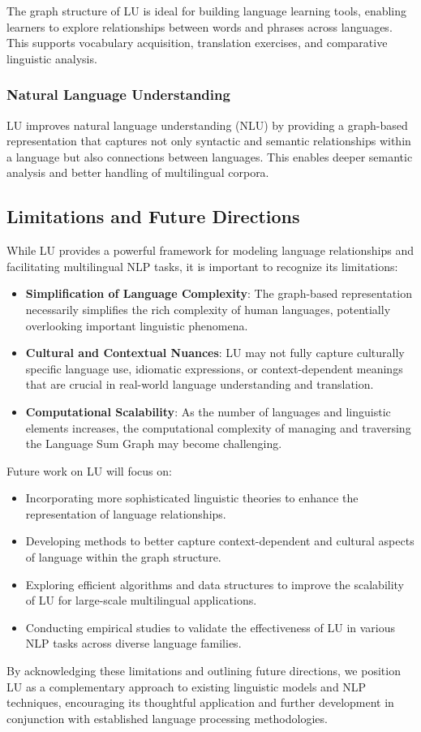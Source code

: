 The graph structure of LU is ideal for building language learning tools, enabling learners to explore relationships between words and phrases across languages. This supports vocabulary acquisition, translation exercises, and comparative linguistic analysis.

\subsubsection{Natural Language Understanding}

LU improves natural language understanding (NLU) by providing a graph-based representation that captures not only syntactic and semantic relationships within a language but also connections between languages. This enables deeper semantic analysis and better handling of multilingual corpora.

\subsection{Limitations and Future Directions}

While LU provides a powerful framework for modeling language relationships and facilitating multilingual NLP tasks, it is important to recognize its limitations:

\begin{itemize}
    \item \textbf{Simplification of Language Complexity}: The graph-based representation necessarily simplifies the rich complexity of human languages, potentially overlooking important linguistic phenomena.
    \item \textbf{Cultural and Contextual Nuances}: LU may not fully capture culturally specific language use, idiomatic expressions, or context-dependent meanings that are crucial in real-world language understanding and translation.
    \item \textbf{Computational Scalability}: As the number of languages and linguistic elements increases, the computational complexity of managing and traversing the Language Sum Graph may become challenging.
\end{itemize}

Future work on LU will focus on:

\begin{itemize}
    \item Incorporating more sophisticated linguistic theories to enhance the representation of language relationships.
    \item Developing methods to better capture context-dependent and cultural aspects of language within the graph structure.
    \item Exploring efficient algorithms and data structures to improve the scalability of LU for large-scale multilingual applications.
    \item Conducting empirical studies to validate the effectiveness of LU in various NLP tasks across diverse language families.
\end{itemize}

By acknowledging these limitations and outlining future directions, we position LU as a complementary approach to existing linguistic models and NLP techniques, encouraging its thoughtful application and further development in conjunction with established language processing methodologies.

